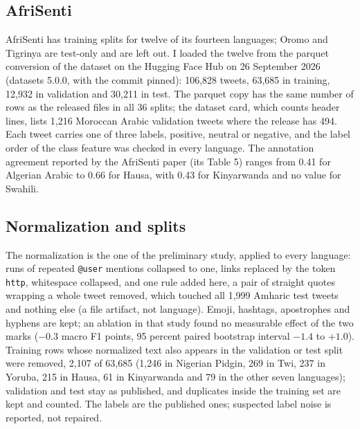 \documentclass[11pt]{article}
\begin{document}
\subsection{AfriSenti}
AfriSenti has training splits for twelve of its fourteen languages; Oromo and Tigrinya are test-only and are left out. I loaded the twelve from the parquet conversion of the dataset on the Hugging Face Hub on 26 September 2026 (datasets 5.0.0, with the commit pinned): 106,828 tweets, 63,685 in training, 12,932 in validation and 30,211 in test. The parquet copy has the same number of rows as the released files in all 36 splits; the dataset card, which counts header lines, lists 1,216 Moroccan Arabic validation tweets where the release has 494. Each tweet carries one of three labels, positive, neutral or negative, and the label order of the class feature was checked in every language. The annotation agreement reported by the AfriSenti paper (its Table 5) ranges from 0.41 for Algerian Arabic to 0.66 for Hausa, with 0.43 for Kinyarwanda and no value for Swahili.

\subsection{Normalization and splits}
The normalization is the one of the preliminary study, applied to every language: runs of repeated \texttt{@user} mentions collapsed to one, links replaced by the token \texttt{http}, whitespace collapsed, and one rule added here, a pair of straight quotes wrapping a whole tweet removed, which touched all 1,999 Amharic test tweets and nothing else (a file artifact, not language). Emoji, hashtags, apostrophes and hyphens are kept; an ablation in that study found no measurable effect of the two marks ($-0.3$ macro F1 points, 95 percent paired bootstrap interval $-1.4$ to $+1.0$). Training rows whose normalized text also appears in the validation or test split were removed, 2,107 of 63,685 (1,246 in Nigerian Pidgin, 269 in Twi, 237 in Yoruba, 215 in Hausa, 61 in Kinyarwanda and 79 in the other seven languages); validation and test stay as published, and duplicates inside the training set are kept and counted. The labels are the published ones; suspected label noise is reported, not repaired.
\end{document}
